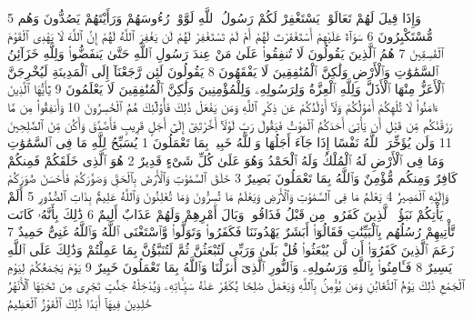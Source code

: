 {\tiny\colorbox{cl_aya}{5}} وَإِذَا قِيلَ لَهُمْ تَعَالَوْا۟ يَسْتَغْفِرْ لَكُمْ رَسُولُ ٱللَّهِ لَوَّوْا۟ رُءُوسَهُمْ وَرَأَيْتَهُمْ يَصُدُّونَ وَهُم مُّسْتَكْبِرُونَ
{\tiny\colorbox{cl_aya}{6}} سَوَآءٌ عَلَيْهِمْ أَسْتَغْفَرْتَ لَهُمْ أَمْ لَمْ تَسْتَغْفِرْ لَهُمْ لَن يَغْفِرَ ٱللَّهُ لَهُمْ إِنَّ ٱللَّهَ لَا يَهْدِى ٱلْقَوْمَ ٱلْفَٰسِقِينَ
{\tiny\colorbox{cl_aya}{7}} هُمُ ٱلَّذِينَ يَقُولُونَ لَا تُنفِقُوا۟ عَلَىٰ مَنْ عِندَ رَسُولِ ٱللَّهِ حَتَّىٰ يَنفَضُّوا۟ وَلِلَّهِ خَزَآئِنُ ٱلسَّمَٰوَٰتِ وَٱلْأَرْضِ وَلَٰكِنَّ ٱلْمُنَٰفِقِينَ لَا يَفْقَهُونَ
{\tiny\colorbox{cl_aya}{8}} يَقُولُونَ لَئِن رَّجَعْنَآ إِلَى ٱلْمَدِينَةِ لَيُخْرِجَنَّ ٱلْأَعَزُّ مِنْهَا ٱلْأَذَلَّ وَلِلَّهِ ٱلْعِزَّةُ وَلِرَسُولِهِۦ وَلِلْمُؤْمِنِينَ وَلَٰكِنَّ ٱلْمُنَٰفِقِينَ لَا يَعْلَمُونَ
{\tiny\colorbox{cl_aya}{9}} يَٰٓأَيُّهَا ٱلَّذِينَ ءَامَنُوا۟ لَا تُلْهِكُمْ أَمْوَٰلُكُمْ وَلَآ أَوْلَٰدُكُمْ عَن ذِكْرِ ٱللَّهِ وَمَن يَفْعَلْ ذَٰلِكَ فَأُو۟لَٰٓئِكَ هُمُ ٱلْخَٰسِرُونَ
{\tiny\colorbox{cl_aya}{10}} وَأَنفِقُوا۟ مِن مَّا رَزَقْنَٰكُم مِّن قَبْلِ أَن يَأْتِىَ أَحَدَكُمُ ٱلْمَوْتُ فَيَقُولَ رَبِّ لَوْلَآ أَخَّرْتَنِىٓ إِلَىٰٓ أَجَلٍ قَرِيبٍ فَأَصَّدَّقَ وَأَكُن مِّنَ ٱلصَّٰلِحِينَ
{\tiny\colorbox{cl_aya}{11}} وَلَن يُؤَخِّرَ ٱللَّهُ نَفْسًا إِذَا جَآءَ أَجَلُهَا وَٱللَّهُ خَبِيرٌۢ بِمَا تَعْمَلُونَ
{\tiny\colorbox{cl_aya}{1}} يُسَبِّحُ لِلَّهِ مَا فِى ٱلسَّمَٰوَٰتِ وَمَا فِى ٱلْأَرْضِ لَهُ ٱلْمُلْكُ وَلَهُ ٱلْحَمْدُ وَهُوَ عَلَىٰ كُلِّ شَىْءٍ قَدِيرٌ
{\tiny\colorbox{cl_aya}{2}} هُوَ ٱلَّذِى خَلَقَكُمْ فَمِنكُمْ كَافِرٌ وَمِنكُم مُّؤْمِنٌ وَٱللَّهُ بِمَا تَعْمَلُونَ بَصِيرٌ
{\tiny\colorbox{cl_aya}{3}} خَلَقَ ٱلسَّمَٰوَٰتِ وَٱلْأَرْضَ بِٱلْحَقِّ وَصَوَّرَكُمْ فَأَحْسَنَ صُوَرَكُمْ وَإِلَيْهِ ٱلْمَصِيرُ
{\tiny\colorbox{cl_aya}{4}} يَعْلَمُ مَا فِى ٱلسَّمَٰوَٰتِ وَٱلْأَرْضِ وَيَعْلَمُ مَا تُسِرُّونَ وَمَا تُعْلِنُونَ وَٱللَّهُ عَلِيمٌۢ بِذَاتِ ٱلصُّدُورِ
{\tiny\colorbox{cl_aya}{5}} أَلَمْ يَأْتِكُمْ نَبَؤُا۟ ٱلَّذِينَ كَفَرُوا۟ مِن قَبْلُ فَذَاقُوا۟ وَبَالَ أَمْرِهِمْ وَلَهُمْ عَذَابٌ أَلِيمٌ
{\tiny\colorbox{cl_aya}{6}} ذَٰلِكَ بِأَنَّهُۥ كَانَت تَّأْتِيهِمْ رُسُلُهُم بِٱلْبَيِّنَٰتِ فَقَالُوٓا۟ أَبَشَرٌ يَهْدُونَنَا فَكَفَرُوا۟ وَتَوَلَّوا۟ وَّٱسْتَغْنَى ٱللَّهُ وَٱللَّهُ غَنِىٌّ حَمِيدٌ
{\tiny\colorbox{cl_aya}{7}} زَعَمَ ٱلَّذِينَ كَفَرُوٓا۟ أَن لَّن يُبْعَثُوا۟ قُلْ بَلَىٰ وَرَبِّى لَتُبْعَثُنَّ ثُمَّ لَتُنَبَّؤُنَّ بِمَا عَمِلْتُمْ وَذَٰلِكَ عَلَى ٱللَّهِ يَسِيرٌ
{\tiny\colorbox{cl_aya}{8}} فَـَٔامِنُوا۟ بِٱللَّهِ وَرَسُولِهِۦ وَٱلنُّورِ ٱلَّذِىٓ أَنزَلْنَا وَٱللَّهُ بِمَا تَعْمَلُونَ خَبِيرٌ
{\tiny\colorbox{cl_aya}{9}} يَوْمَ يَجْمَعُكُمْ لِيَوْمِ ٱلْجَمْعِ ذَٰلِكَ يَوْمُ ٱلتَّغَابُنِ وَمَن يُؤْمِنۢ بِٱللَّهِ وَيَعْمَلْ صَٰلِحًا يُكَفِّرْ عَنْهُ سَيِّـَٔاتِهِۦ وَيُدْخِلْهُ جَنَّٰتٍ تَجْرِى مِن تَحْتِهَا ٱلْأَنْهَٰرُ خَٰلِدِينَ فِيهَآ أَبَدًا ذَٰلِكَ ٱلْفَوْزُ ٱلْعَظِيمُ
